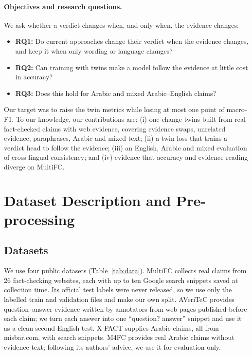 \documentclass[11pt,a4paper]{article}
\begin{document}
\paragraph{Objectives and research questions.}
We ask whether a verdict changes when, and only when, the evidence changes:
\begin{itemize}\setlength{\itemsep}{1pt}
  \item \textbf{RQ1:} Do current approaches change their verdict when the evidence changes, and keep it when only wording or language changes?
  \item \textbf{RQ2:} Can training with twins make a model follow the evidence at little cost in accuracy?
  \item \textbf{RQ3:} Does this hold for Arabic and mixed Arabic--English claims?
\end{itemize}
Our target was to raise the twin metrics while losing at most one point of macro-F1. To our knowledge, our contributions are: (i) one-change twins built from real fact-checked claims with web evidence, covering evidence swaps, unrelated evidence, paraphrases, Arabic and mixed text; (ii) a twin loss that trains a verdict head to follow the evidence; (iii) an English, Arabic and mixed evaluation of cross-lingual consistency; and (iv) evidence that accuracy and evidence-reading diverge on MultiFC.

\section{Dataset Description and Pre-processing}

\subsection{Datasets}
We use four public datasets (Table~\ref{tab:data}). MultiFC \citep{augenstein2019multifc} collects real claims from 26 fact-checking websites, each with up to ten Google search snippets saved at collection time. Its official test labels were never released, so we use only the labelled train and validation files and make our own split. AVeriTeC \citep{schlichtkrull2023averitec} provides question--answer evidence written by annotators from web pages published before each claim; we turn each answer into one ``question? answer'' snippet and use it as a clean second English test. X-FACT \citep{gupta2021xfact} supplies Arabic claims, all from misbar.com, with search snippets. M4FC \citep{geng2025m4fc} provides real Arabic claims without evidence text; following its authors' advice, we use it for evaluation only.
\end{document}
